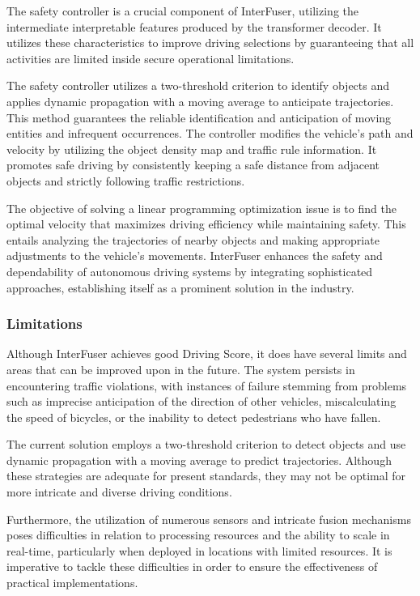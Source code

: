 The safety controller is a crucial component of InterFuser, utilizing the intermediate interpretable features produced by the transformer decoder. It utilizes these characteristics to improve driving selections by guaranteeing that all activities are limited inside secure operational limitations.

The safety controller utilizes a two-threshold criterion to identify objects and applies dynamic propagation with a moving average to anticipate trajectories. This method guarantees the reliable identification and anticipation of moving entities and infrequent occurrences. The controller modifies the vehicle's path and velocity by utilizing the object density map and traffic rule information. It promotes safe driving by consistently keeping a safe distance from adjacent objects and strictly following traffic restrictions.

The objective of solving a linear programming optimization issue is to find the optimal velocity that maximizes driving efficiency while maintaining safety. This entails analyzing the trajectories of nearby objects and making appropriate adjustments to the vehicle's movements. InterFuser enhances the safety and dependability of autonomous driving systems by integrating sophisticated approaches, establishing itself as a prominent solution in the industry.

\subsubsection{Limitations}

Although InterFuser achieves good Driving Score, it does have several limits and areas that can be improved upon in the future. The system persists in encountering traffic violations, with instances of failure stemming from problems such as imprecise anticipation of the direction of other vehicles, miscalculating the speed of bicycles, or the inability to detect pedestrians who have fallen.

The current solution employs a two-threshold criterion to detect objects and use dynamic propagation with a moving average to predict trajectories. Although these strategies are adequate for present standards, they may not be optimal for more intricate and diverse driving conditions. 

Furthermore, the utilization of numerous sensors and intricate fusion mechanisms poses difficulties in relation to processing resources and the ability to scale in real-time, particularly when deployed in locations with limited resources. It is imperative to tackle these difficulties in order to ensure the effectiveness of practical implementations.